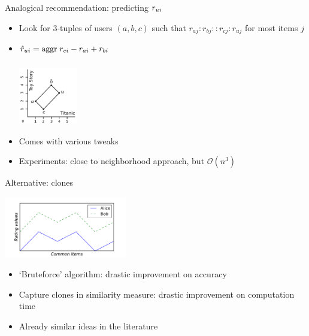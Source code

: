 \documentclass{beamer}
\begin{document}
\begin{frame}{Analogical recommendation: predicting $r_{ui}$}
  \begin{itemize}
    \item Look for $3$-tuples of users $(a, b, c)$ such that $r_{aj}: r_{bj} ::
      r_{cj} : r_{uj}$ for most items $j$
    \item $\hat{r}_{ui} = \underset{}{\operatorname{aggr}}\; r_{ci} - r_{ai} + r_{bi}$
    \begin{center}
      \includegraphics[width=0.2\textwidth]{figures/analogical_recommendation.pdf}
    \end{center}
  \item Comes with various tweaks
  \item \alert{Experiments}: close to neighborhood approach, but $\mathcal{O}(n^3)$
  \end{itemize}
\end{frame}

\begin{frame}{Alternative: clones}
    \begin{center}
      \includegraphics[width=0.4\textwidth]{figures/clones.pdf}
    \end{center}
    \begin{itemize}
      \item `Bruteforce' algorithm: drastic improvement on accuracy
      \item Capture clones in similarity measure: drastic improvement on
        computation time
      \item Already similar ideas in the literature
    \end{itemize}
\end{frame}
\end{document}
